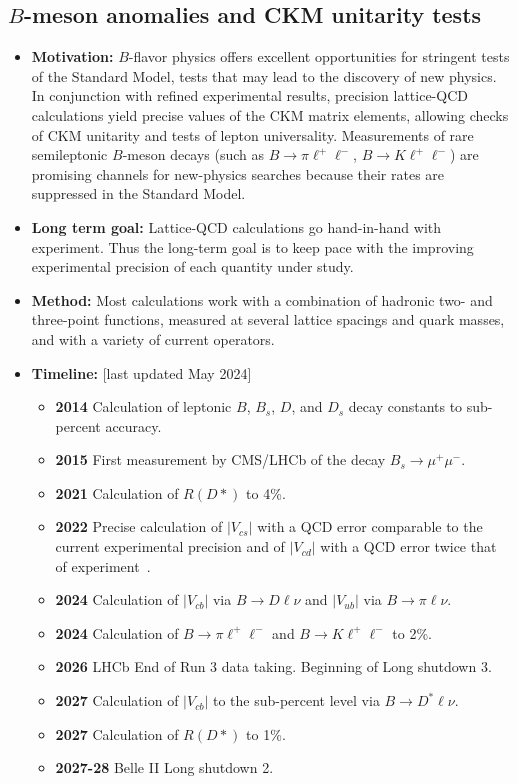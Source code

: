 \documentclass[12pt,hyperpdf]{article}
\begin{document}
\subsection{$B$-meson anomalies and CKM unitarity tests}
\begin{itemize}
    \item{\bf Motivation:} $B$-flavor physics offers excellent opportunities for stringent tests of the Standard Model, tests that may lead to the discovery of new physics. In conjunction with refined experimental results, precision lattice-QCD calculations yield precise values of the CKM matrix elements, allowing checks of CKM unitarity and tests of lepton universality. Measurements of rare semileptonic $B$-meson decays (such as $B\to\pi\ell^+\ell^-$, $B\to K\ell^+\ell^-$) are promising channels for new-physics searches because their rates are suppressed in the Standard Model.
    \item{\bf Long term goal:} Lattice-QCD calculations go hand-in-hand with experiment.  Thus the long-term goal is to keep pace with the improving experimental precision of each quantity under study.
    \item{\bf Method:} Most calculations work with a combination of hadronic two- and three-point functions, measured at several lattice spacings and quark masses, and with a variety of current operators. 
\item{\bf Timeline:} \hfill [last updated May 2024]
\begin{itemize}
    \item{\bf 2014} Calculation of leptonic $B$, $B_s$, $D$, and $D_s$ decay constants to sub-percent accuracy.
    \item{\bf 2015} First measurement by CMS/LHCb of the decay $B_s \to \mu^+\mu^-$.
    \item{\bf 2021} Calculation of $R(D*)$ to 4\%.
    \item{\bf 2022} Precise calculation of $|V_{cs}|$ with a QCD error comparable to the current experimental precision and of $|V_{cd}|$ with a QCD error twice that of experiment~\cite{FermilabLattice:2022gku}.
    \item{\bf 2024} Calculation of $|V_{cb}|$ via $B\to D\ell\nu$ and $|V_{ub}|$ via $B\to \pi\ell\nu$.
    \item{\bf 2024} Calculation of $B\to\pi \ell^+\ell^-$ and $B\to K \ell^+\ell^-$ to 2\%.
    \item{\bf 2026} LHCb End of Run 3 data taking. Beginning of Long shutdown 3.
    \item{\bf 2027} Calculation of $|V_{cb}|$ to the sub-percent level via $B\to D^*\ell\nu$.
    \item{\bf 2027} Calculation of $R(D*)$ to 1\%.
    \item{\bf 2027-28} Belle II Long shutdown 2.
\end{itemize}
\end{itemize}
\end{document}
